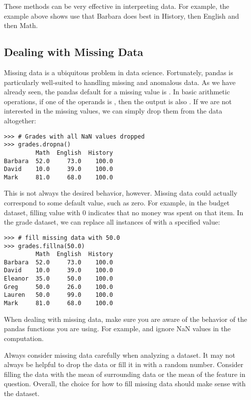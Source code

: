 These methods can be very effective in interpreting data.
For example, the  example above shows use that Barbara does best in History, then English and then Math.

\subsection*{Dealing with Missing Data}

Missing data is a ubiquitous problem in data science.
Fortunately, pandas is particularly well-suited to
handling missing and anomalous data.
As we have already seen, the pandas default for a missing value is .
In basic arithmetic operations, if one of the operands is , then the output is also .
If we are not interested in the missing values, we can simply drop them from the data altogether:

\begin{lstlisting}
>>> # Grades with all NaN values dropped
>>> grades.dropna()
         Math  English  History
Barbara  52.0     73.0    100.0
David    10.0     39.0    100.0
Mark     81.0     68.0    100.0
\end{lstlisting}

This is not always the desired behavior, however.
Missing data could actually correspond to some default value, such as zero.
For example, in the budget dataset, filling  value with 0 indicates that no money was spent on that item.
In the grade dataset, we can replace all instances of  with a specified value:
\begin{lstlisting}
>>> # fill missing data with 50.0
>>> grades.fillna(50.0)
         Math  English  History
Barbara  52.0     73.0    100.0
David    10.0     39.0    100.0
Eleanor  35.0     50.0    100.0
Greg     50.0     26.0    100.0
Lauren   50.0     99.0    100.0
Mark     81.0     68.0    100.0
\end{lstlisting}

When dealing with missing data, make sure you are aware of the behavior of the pandas functions you are using.
For example,  and  ignore NaN values in the computation.

\begin{warn}
Always consider missing data carefully when analyzing a dataset.
It may not always be helpful to drop the data or fill it in with a random number.
Consider filling the data with the mean of surrounding data or the mean of the feature in question.
Overall, the choice for how to fill missing data should make sense with the dataset.
\end{warn}

